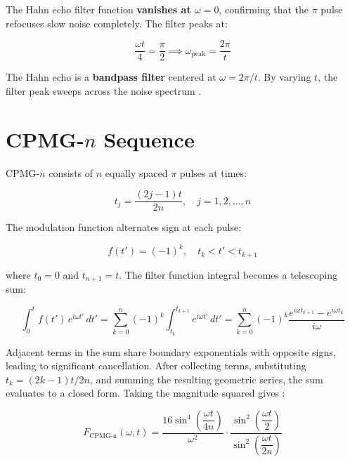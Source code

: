 \documentclass[12pt]{article}
\begin{document}
The Hahn echo filter function \textbf{vanishes at $\omega = 0$}, confirming that the $\pi$ pulse refocuses slow noise completely. The filter peaks at:

\begin{equation}
    \frac{\omega t}{4} = \frac{\pi}{2} \implies \omega_\text{peak} = \frac{2\pi}{t}
\end{equation}

The Hahn echo is a \textbf{bandpass filter} centered at $\omega = 2\pi/t$. By varying $t$, the filter peak sweeps across the noise spectrum \cite{Cywinski2008}.

\section{CPMG-\texorpdfstring{$n$}{n} Sequence}

CPMG-$n$ consists of $n$ equally spaced $\pi$ pulses at times:

\begin{equation}
    t_j = \frac{(2j-1)t}{2n}, \quad j = 1, 2, \ldots, n
\end{equation}

The modulation function alternates sign at each pulse:

\begin{equation}
    f(t') = (-1)^k, \quad t_k < t' < t_{k+1}
\end{equation}

where $t_0 = 0$ and $t_{n+1} = t$. The filter function integral becomes a telescoping sum:

\begin{equation}
    \int_0^t f(t')\, e^{i\omega t'}\, dt' = \sum_{k=0}^{n} (-1)^k \int_{t_k}^{t_{k+1}} e^{i\omega t'}\, dt' = \sum_{k=0}^{n} (-1)^k \frac{e^{i\omega t_{k+1}} - e^{i\omega t_k}}{i\omega}
\end{equation}

Adjacent terms in the sum share boundary exponentials with opposite signs, leading to significant cancellation. After collecting terms, substituting $t_k = (2k-1)t/2n$, and summing the resulting geometric series, the sum evaluates to a closed form. Taking the magnitude squared gives \cite{Cywinski2008}:

\begin{equation}
    \boxed{F_\text{CPMG-n}(\omega, t) = \frac{16\sin^4\!\left(\dfrac{\omega t}{4n}\right)}{\omega^2} \cdot \frac{\sin^2\!\left(\dfrac{\omega t}{2}\right)}{\sin^2\!\left(\dfrac{\omega t}{2n}\right)}}
\end{equation}
\end{document}
